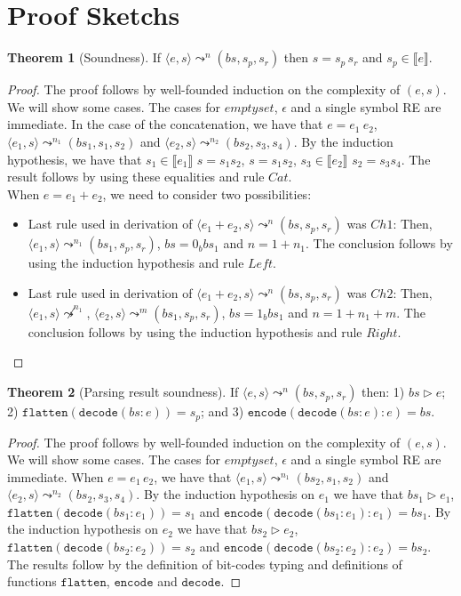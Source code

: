 \documentclass[review]{elsarticle}
\newcommand{\sembrackets}[1]{\ensuremath{\llbracket #1 \rrbracket}}
\newcommand{\flatten}{\ensuremath{\texttt{flatten}}}
\newcommand{\code}{\ensuremath{\texttt{encode}}}
\newcommand{\decodee}{\ensuremath{\texttt{decode}}}
\theoremstyle{definition}
\newtheorem*{Theorem*}{Theorem}
\begin{document}
\section{Proof Sketchs}\label{section:proofs-scketchs}

\begin{Theorem*}[Soundness]
  If $\langle e, s \rangle \leadsto^n (bs,s_p,s_r)$ then $s = s_p\,s_r$ and $s_p\in\sembrackets{e}$.
\end{Theorem*}
\begin{proof}
  The proof follows by well-founded induction on the complexity of $(e,s)$. We will
  show some cases. The cases for $emptyset$, $\epsilon$ and a single symbol RE
  are immediate. In the case of the concatenation, we have that $e = e_1\:e_2$,
  $\langle e_1, s \rangle\leadsto^{n_1}(bs_1,s_1,s_2)$ and
  $\langle e_2, s \rangle\leadsto^{n_2}(bs_2,s_3,s_4)$. By the induction
  hypothesis, we have that $s_1\in\sembrackets{e_1}$ $s = s_1s_2$,
  $s = s_1 s_2$, $s_3\in\sembrackets{e_2}$ $s_2 = s_3s_4$. The result follows
  by using these equalities and rule $Cat$.\\
  When $e = e_1 + e_2$, we need to consider two possibilities:
  \begin{itemize}
    \item Last rule used in derivation of $\langle e_1 + e_2, s \rangle
      \leadsto^n (bs,s_p,s_r)$ was $Ch1$: Then,
      $\langle e_1, s \rangle \leadsto^{n_1} (bs_1,s_p,s_r)$, $bs = 0_bbs_1$ and
      $n = 1 + n_1$. The conclusion follows by using the induction hypothesis
      and rule $Left$.
    \item Last rule used in derivation of $\langle e_1 + e_2, s \rangle
      \leadsto^n (bs,s_p,s_r)$ was $Ch2$: Then,
      $\langle e_1, s \rangle \not\leadsto^{n_1}$,
      $\langle e_2, s \rangle \leadsto^{m} (bs_1,s_p,s_r)$, $bs = 1_bbs_1$ and
      $n = 1 + n_1 + m$. The conclusion follows by using the induction hypothesis
      and rule $Right$.
  \end{itemize}
\end{proof}

\begin{Theorem*}[Parsing result soundness]
  If $\langle e, s \rangle \leadsto^n (bs,s_p,s_r)$ then: 1) $bs \rhd e$; 2) $\flatten(\decodee(bs : e)) = s_p$; and 3)
  $\code(\decodee(bs : e) : e) = bs$. 
\end{Theorem*}
\begin{proof}
  The proof follows by well-founded induction on the complexity of $(e,s)$. We
  will show some cases. The cases for $emptyset$, $\epsilon$ and a single symbol RE
  are immediate. When $e = e_1\,e_2$, we have that
    $\langle e_1, s \rangle\leadsto^{n_1}(bs_2,s_1,s_2)$ and
  $\langle e_2, s \rangle\leadsto^{n_2}(bs_2,s_3,s_4)$. By the induction
  hypothesis on $e_1$ we have that $bs_1 \rhd e_1$, $\flatten(\decodee(bs_1 : e_1)) =
  s_1$ and $\code(\decodee(bs_1 : e_1) : e_1) = bs_1$. 
By the induction
  hypothesis on $e_2$ we have that $bs_2 \rhd e_2$, $\flatten(\decodee(bs_2 : e_2)) =
  s_2$ and $\code(\decodee(bs_2 : e_2) : e_2) = bs_2$. The results follow by the
  definition of bit-codes typing and definitions of functions $\flatten$,
  $\code$ and $\decodee$. 
\end{proof}
\end{document}
